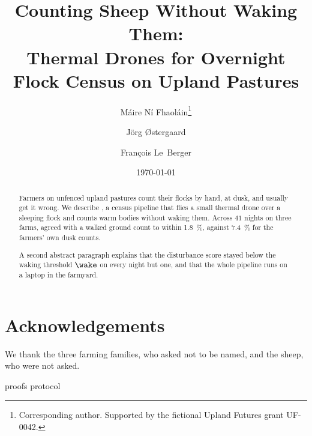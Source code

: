 \documentclass[11pt,a4paper]{article}
\title{Counting Sheep Without Waking Them:\\ Thermal Drones for Overnight Flock Census on Upland Pastures}
\author{M\'aire N\'i Fhaol\'ain\thanks{Corresponding author. Supported by the fictional Upland Futures grant UF-0042.} \and J\"org \O{}stergaard \and Fran\c{c}ois Le~Berger}
\date{\today}
\theoremstyle{definition}
\theoremstyle{remark}
\begin{document}
\maketitle

\begin{abstract}
Farmers on unfenced upland pastures count their flocks by hand, at dusk, and usually get it wrong. We describe \sys, a census pipeline that flies a small thermal drone over a sleeping flock and counts warm bodies without waking them. Across $41$ nights on three farms, \sys{} agreed with a walked ground count to within \SI{1.8}{\percent}, against \SI{7.4}{\percent} for the farmers' own dusk counts.

A second abstract paragraph explains that the disturbance score stayed below the waking threshold $\wake$ on every night but one, and that the whole pipeline runs on a laptop in the farmyard.
\end{abstract}





% 



\section*{Acknowledgements}
We thank the three farming families, who asked not to be named, and the sheep, who were not asked.

\appendix
{proofs}
{protocol}



\end{document}
